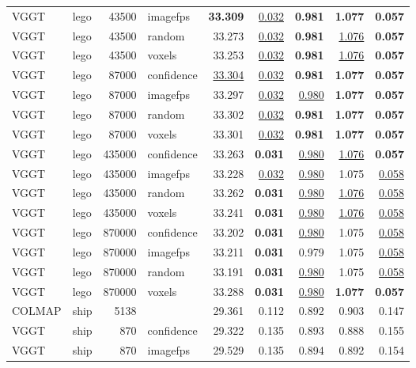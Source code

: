 \begin{table}[H]
\begin{tabular}{llrlrrrrr}
VGGT & lego & 43500 & imagefps & \textbf{33.309} & \underline{0.032} & \textbf{0.981} & \textbf{1.077} & \textbf{0.057} \\
VGGT & lego & 43500 & random & 33.273 & \underline{0.032} & \textbf{0.981} & \underline{1.076} & \textbf{0.057} \\
VGGT & lego & 43500 & voxels & 33.253 & \underline{0.032} & \textbf{0.981} & \underline{1.076} & \textbf{0.057} \\
VGGT & lego & 87000 & confidence & \underline{33.304} & \underline{0.032} & \textbf{0.981} & \textbf{1.077} & \textbf{0.057} \\
VGGT & lego & 87000 & imagefps & 33.297 & \underline{0.032} & \underline{0.980} & \textbf{1.077} & \textbf{0.057} \\
VGGT & lego & 87000 & random & 33.302 & \underline{0.032} & \textbf{0.981} & \textbf{1.077} & \textbf{0.057} \\
VGGT & lego & 87000 & voxels & 33.301 & \underline{0.032} & \textbf{0.981} & \textbf{1.077} & \textbf{0.057} \\
VGGT & lego & 435000 & confidence & 33.263 & \textbf{0.031} & \underline{0.980} & \underline{1.076} & \textbf{0.057} \\
VGGT & lego & 435000 & imagefps & 33.228 & \underline{0.032} & \underline{0.980} & 1.075 & \underline{0.058} \\
VGGT & lego & 435000 & random & 33.262 & \textbf{0.031} & \underline{0.980} & \underline{1.076} & \underline{0.058} \\
VGGT & lego & 435000 & voxels & 33.241 & \textbf{0.031} & \underline{0.980} & \underline{1.076} & \underline{0.058} \\
VGGT & lego & 870000 & confidence & 33.202 & \textbf{0.031} & \underline{0.980} & 1.075 & \underline{0.058} \\
VGGT & lego & 870000 & imagefps & 33.211 & \textbf{0.031} & 0.979 & 1.075 & \underline{0.058} \\
VGGT & lego & 870000 & random & 33.191 & \textbf{0.031} & \underline{0.980} & 1.075 & \underline{0.058} \\
VGGT & lego & 870000 & voxels & 33.288 & \textbf{0.031} & \underline{0.980} & \textbf{1.077} & \textbf{0.057} \\
\midrule
COLMAP & ship & 5138 &  & 29.361 & 0.112 & 0.892 & 0.903 & 0.147 \\
VGGT & ship & 870 & confidence & 29.322 & 0.135 & 0.893 & 0.888 & 0.155 \\
VGGT & ship & 870 & imagefps & 29.529 & 0.135 & 0.894 & 0.892 & 0.154 \\

\end{tabular}
\end{table}
